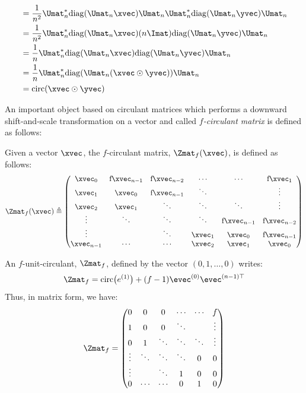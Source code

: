 \begin{itemize}[leftmargin=13pt]
\begin{align}
      &= \frac{1}{n^2}  \Umat_n^* \diag(\Umat_n \xvec) \Umat_n \Umat_n^* \diag(\Umat_n \yvec) \Umat_n  \\
      &= \frac{1}{n^2}  \Umat_n^* \diag(\Umat_n \xvec) (n \Imat) \diag(\Umat_n \yvec) \Umat_n  \\
      &= \frac{1}{n}  \Umat_n^* \diag(\Umat_n \xvec) \diag(\Umat_n \yvec) \Umat_n  \\
      &= \frac{1}{n}  \Umat_n^* \diag(\Umat_n (\xvec \odot \yvec)) \Umat_n  \\
      &= \circulant(\xvec \odot \yvec)
    \end{align}
\end{itemize}

\endgroup




An important object based on circulant matrices which performs a downward shift-and-scale transformation on a vector and called \emph{$f$-circulant matrix} is defined as follows:
\begin{definition} \label{definition:ch2-f_circulant_matrix}
  Given a vector $\xvec$, the $f$-circulant matrix, $\Zmat_f(\xvec)$, is defined as follows:
  \begin{equation}
    \Zmat_f(\xvec) \triangleq
    \leftmatrix
      \xvec_0 & $f$ \xvec_{n-1} & $f$ \xvec_{n-2} & \cdots & \cdots & $f$ \xvec_{1} \\
      \xvec_{1} & \xvec_0 & $f$ \xvec_{n-1} & \ddots & & \vdots \\
      \xvec_{2} & \xvec_{1} & \ddots & \ddots & \ddots & \vdots \\ 
      \vdots & \ddots & \ddots & \ddots & $f$ \xvec_{n-1} & $f$ \xvec_{n-2} \\
      \vdots & & \ddots & \xvec_{1} & \xvec_{0} & $f$ \xvec_{n-1} \\
      \xvec_{n-1} & \cdots & \cdots & \xvec_{2} & \xvec_{1} & \xvec_0
    \rightmatrix
  \end{equation}
  \removespace
\end{definition}
\noindent
An $f$-unit-circulant, $\Zmat_f$, defined by the vector $\left(0, 1, \dots, 0 \right)$ writes:
\begin{equation}
  \Zmat_f = \circulant \big(e^{(1)} \big) + (f - 1) \evec^{(0)} \evec^{(n-1)\top}
\end{equation}
\noindent
Thus, in matrix form, we have:
\begin{equation}
  \Zmat_f = 
    \leftmatrix
      0      & 0      & 0      & \cdots & \cdots & f      \\
      1      & 0      & 0      & \ddots &        & \vdots \\
      0      & 1      & \ddots & \ddots & \ddots & \vdots \\ 
      \vdots & \ddots & \ddots & \ddots & 0      & 0      \\
      \vdots &        & \ddots & 1      & 0      & 0      \\
      0      & \cdots & \cdots & 0      & 1      & 0
    \rightmatrix
\end{equation}
